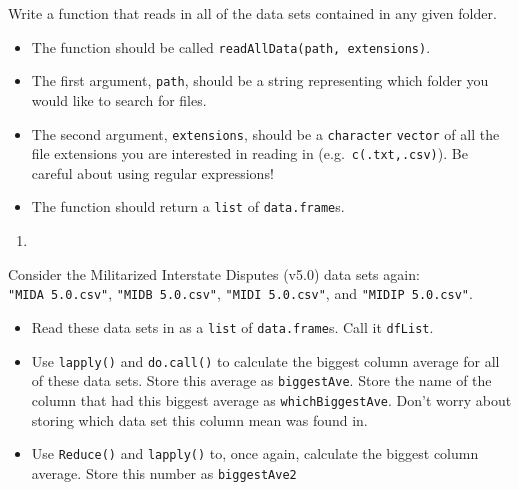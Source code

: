 \documentclass[12pt,krantz2]{krantz}
\providecommand{\tightlist}{%
  \setlength{\itemsep}{0pt}\setlength{\parskip}{0pt}}
\begin{document}
Write a function that reads in all of the data sets contained in any given folder.

\begin{itemize}
\tightlist
\item
  The function should be called \texttt{readAllData(path,\ extensions)}.
\item
  The first argument, \texttt{path}, should be a string representing which folder you would like to search for files.
\item
  The second argument, \texttt{extensions}, should be a \texttt{character} \texttt{vector} of all the file extensions you are interested in reading in (e.g.~\texttt{c(\textquotesingle{}.txt\textquotesingle{},\textquotesingle{}.csv\textquotesingle{})}). Be careful about using regular expressions!
\item
  The function should return a \texttt{list} of \texttt{data.frame}s.
\end{itemize}

\begin{enumerate}
\def\labelenumi{\arabic{enumi}.}
\setcounter{enumi}{2}
\item
\end{enumerate}

Consider the Militarized Interstate Disputes (v5.0) \citep{mid5} data sets again: \texttt{"MIDA\ 5.0.csv"}, \texttt{"MIDB\ 5.0.csv"}, \texttt{"MIDI\ 5.0.csv"}, and \texttt{"MIDIP\ 5.0.csv"}.

\begin{itemize}
\tightlist
\item
  Read these data sets in as a \texttt{list} of \texttt{data.frame}s. Call it \texttt{dfList}.
\item
  Use \texttt{lapply()} and \texttt{do.call()} to calculate the biggest column average for all of these data sets. Store this average as \texttt{biggestAve}. Store the name of the column that had this biggest average as \texttt{whichBiggestAve}. Don't worry about storing which data set this column mean was found in.
\item
  Use \texttt{Reduce()} and \texttt{lapply()} to, once again, calculate the biggest column average. Store this number as \texttt{biggestAve2}
\end{itemize}



\backmatter
\printindex
\end{document}
